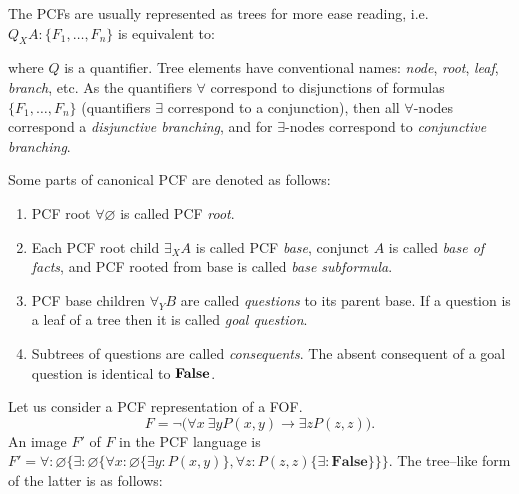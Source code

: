 \documentclass[a4paper,12pt]{article}
\begin{document}
The PCFs are usually represented as trees for more ease reading, i.e. $Q_XA\colon\{F_1,\ldots,F_n\}$ is equivalent to:
\begin{center}
\end{center}
\noindent where $Q$ is a quantifier. Tree elements have conventional names: \emph{node}, \emph{root}, \emph{leaf}, \emph{branch}, etc. As the quantifiers $\forall$ correspond to disjunctions of formulas $\{F_1,\ldots,F_n\}$ (quantifiers $\exists$ correspond to a conjunction), then all $\forall$-nodes correspond a {\em disjunctive branching}, and for $\exists$-nodes correspond to {\em conjunctive branching}.

Some parts of canonical PCF are denoted as follows:
\begin{enumerate}
\item PCF root $\forall \varnothing$ is called PCF {\em root}.
\item Each PCF root child $\exists_XA$ is called PCF {\em base}, conjunct $A$ is called {\em base of facts}, and PCF rooted from base is called {\em base subformula}.
\item PCF base children $\forall_YB$ are called {\em questions} to its parent base.  If a question is a leaf of a tree then it is called {\em goal question}.
\item Subtrees of questions are called {\em consequents}.  The absent consequent of a goal question is identical to $\text{\textbf{False}}$.
\end{enumerate}


\begin{example}
Let us consider a PCF representation of a FOF.
$$F= \neg\bigl(\forall x\:\exists y P(x,y)\rightarrow \exists z P(z,z)\bigr).$$
An image $F'$ of $F$ in the PCF language is $F' = \forall\colon \varnothing\{\exists\colon\varnothing\{\forall x\colon\varnothing\{\exists y\colon P(x,y)\}, \forall z\colon P(z,z)\{\exists\colon\boldsymbol{False}\}\}\}.$
The tree--like form of the latter is as follows:
\begin{center}
\end{center}
\end{example}
\end{document}
